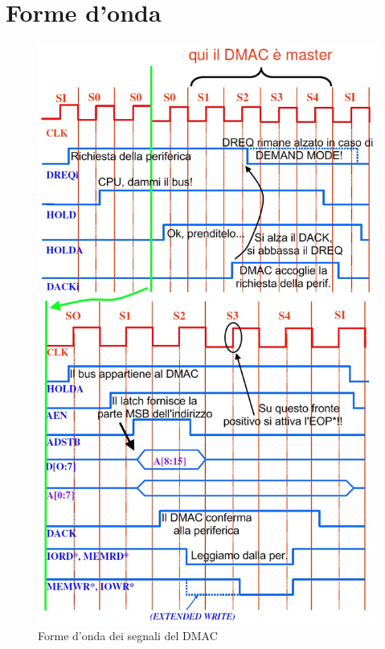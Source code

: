 \clearpage
\section{Forme d'onda}
\label{sec:formeOnda}

\begin{figure}[!h]
\centering
\includegraphics[width=0.78\columnwidth]{img/OndeDMAC}
\caption{Forme d'onda dei segnali del DMAC}
\label{fig:OndeDMAC}
\end{figure}

%
%

